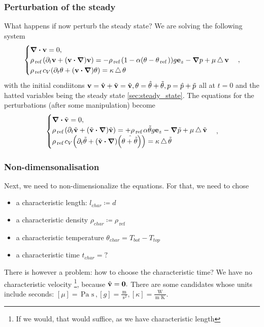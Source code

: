 \documentclass[reqno, a4paper]{article}
\begin{document}
\subsubsection{Perturbation of the steady}
\label{sec:perturbation}
What happens if now perturb the steady state? We are solving the following system
\[
	\begin{cases}
		\divergence{\vb{v}} = 0, \\
		\rho_{\, \text{ref} \,}\qty(\partial_t \vb{v}+ \qty(\vb{v} \vdot \grad)\vb{v}) = -\rho_{\, \text{ref} \,}\qty(1- \alpha\qty(\theta-\theta_{\, \text{ref} \,}))g \vb{e}_z - \grad p + \mu \laplace \vb{v}\\ 
		\rho_{\, \text{ref} \,} c_{V}\qty(\partial_t \theta + \qty(\vb{v} \vdot \grad)\theta) = \kappa \laplace\theta
	\end{cases},
\]
with the initial condiitons $\vb{v} = \hat{\vb{v}} + \tilde{\vb{v}} = \tilde{\vb{v}}, \theta = \hat{\theta}+ \tilde{\theta}, p = \hat{p}+ \tilde{p}$ all at $t =0$ and the hatted variables being the steady state \ref{sec:steady_state}. The equations for the perturbations (after some manipulation) become 
\[
	\begin{cases}
		\divergence{\tilde{\vb{v}}} = 0, \\
		\rho_{\, \text{ref} \,}\qty(\partial_t \tilde{\vb{v}}+ \qty(\tilde{\vb{v}} \vdot \grad)\tilde{\vb{v}}) = +\rho_{\, \text{ref} \,} \alpha\tilde{\theta}g \vb{e}_z - \grad \tilde{p} + \mu \laplace \tilde{\vb{v}}\\ 
		\rho_{\, \text{ref} \,} c_{V}\qty(\partial_t \tilde{\theta} + \qty(\tilde{\vb{v}} \vdot \grad)\qty(\hat{\theta + \tilde{\theta}})) = \kappa \laplace\tilde{\theta}
	\end{cases},
\]
\subsubsection{Non-dimensonalisation}
\label{sec:dimless}
Next, we need to non-dimensionalize the equations. For that, we need to chose 
\begin{itemize}
	\item a characteristic length: $l_{char} \coloneq d$
	\item a characteristic density $\rho_{char} \coloneq  \rho_{\, \text{ref} \,}$
	\item a characteristic temperature $\theta_{char} = T_{bot}-T_{top}$
	\item a characteristic time $t_{char} = ?$
\end{itemize}
There is however a problem: how to choose the characteristic time? We have no characteristic velocity \footnote{If we would, that would suffice, as we have characteristic length}, because $\hat{\vb{v}} = \vb{0}.$ There are some candidates whose units include seconds: $[\mu] = \, \text{Pa s} \,, [g] = \frac{\, \text{m} \,}{\, \text{s}^{2}}, [\kappa] = \frac{\, \text{W} \,}{\, \text{m K} \,}.$
\end{document}
